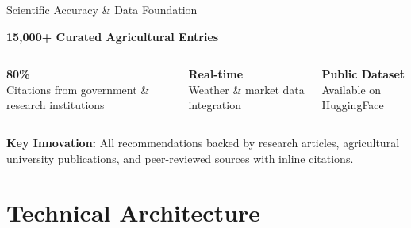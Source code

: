 \documentclass[aspectratio=169]{beamer}
\begin{document}
\begin{frame}{Scientific Accuracy \& Data Foundation}
\begin{center}
\Large{\textbf{15,000+ Curated Agricultural Entries}}
\end{center}

\vspace{0.5cm}
\begin{columns}
\begin{column}{0.33\textwidth}
\begin{center}
\textcolor{indicgreen}{\textbf{80\%}} \\
Citations from government \& research institutions
\end{center}
\end{column}
\begin{column}{0.33\textwidth}
\begin{center}
\textcolor{indicorange}{\textbf{Real-time}} \\
Weather \& market data integration
\end{center}
\end{column}
\begin{column}{0.33\textwidth}
\begin{center}
\textcolor{indicblue}{\textbf{Public Dataset}} \\
Available on HuggingFace
\end{center}
\end{column}
\end{columns}

\vspace{0.5cm}
\textbf{Key Innovation:} All recommendations backed by research articles, agricultural university publications, and peer-reviewed sources with inline citations.
\end{frame}

\section{Technical Architecture}
\end{document}

